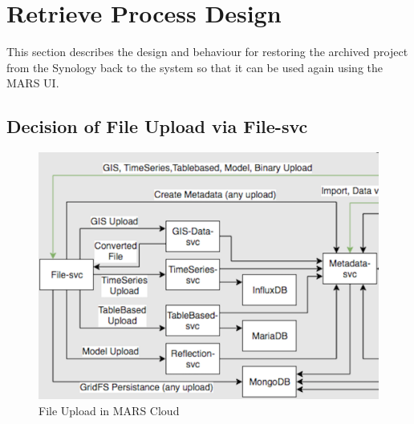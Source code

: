 \section{Retrieve Process Design}
This section describes the design and behaviour for restoring the archived project from the Synology back to the system
so that it can be used again using the MARS UI.   

\subsection{Decision of File Upload via File-svc}

\begin{figure}[H]
    \centering \includegraphics[scale=0.4]{grafiken/mars-cloud.png}
    \caption{File Upload in MARS Cloud \cite{MARSCLoud}}
    \label{fig:MARSCloud}
\end{figure}

